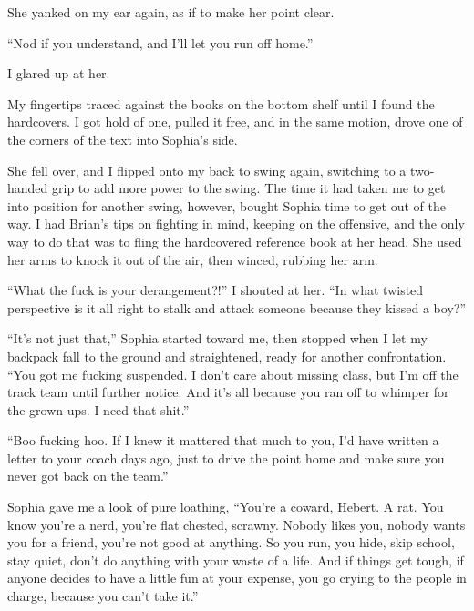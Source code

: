 She yanked on my ear again, as if to make her point clear.



``Nod if you understand, and I'll let you run off home.''



I glared up at her.



My fingertips traced against the books on the bottom shelf until I found the hardcovers.  I got hold of one, pulled it free, and in the same motion, drove one of the corners of the text into Sophia's side.



She fell over, and I flipped onto my back to swing again, switching to a two-handed grip to add more power to the swing.  The time it had taken me to get into position for another swing, however, bought Sophia time to get out of the way.  I had Brian's tips on fighting in mind, keeping on the offensive, and the only way to do that was to fling the hardcovered reference book at her head.  She used her arms to knock it out of the air, then winced, rubbing her arm.



``What the fuck is your derangement?!'' I shouted at her.  ``In what twisted perspective is it all right to stalk and attack someone because they kissed a boy?''



``It's not just that,'' Sophia started toward me, then stopped when I let my backpack fall to the ground and straightened, ready for another confrontation.  ``You got me fucking suspended.  I don't care about missing class, but I'm off the track team until further notice.  And it's all because you ran off to whimper for the grown-ups.  I need that shit.''



``Boo fucking hoo.  If I knew it mattered that much to you, I'd have written a letter to your coach days ago, just to drive the point home and make sure you never got back on the team.''



Sophia gave me a look of pure loathing, ``You're a coward, Hebert.  A rat.  You know you're a nerd, you're flat chested, scrawny.  Nobody likes you, nobody wants you for a friend, you're not good at anything.  So you run, you hide, skip school, stay quiet, don't do anything with your waste of a life.  And if things get tough, if anyone decides to have a little fun at your expense, you go crying to the people in charge, because you can't take it.''



